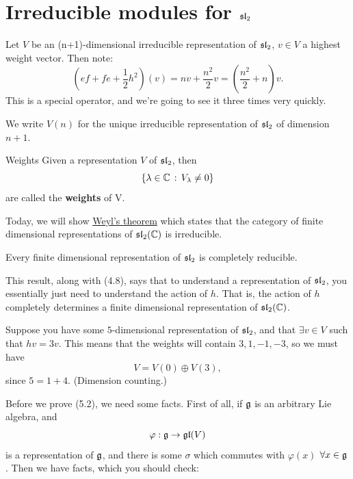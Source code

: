 \documentclass{article}
\begin{document}
\newlec 
\section{Irreducible modules for $\mathfrak{sl}_{2}$}
\begin{remark}
    Let $V$ be an (n+1)-dimensional irreducible representation of $\mathfrak{sl}_{2}$, $v \in V$ a highest weight vector. Then note: \[ (ef + fe + \frac{1}{2}h^{2})(v) = nv + \frac{n^{2}}{2}v = (\frac{n^{2}}{2}+n)v.\]
    This is a special operator, and we're going to see it three times very quickly.
\end{remark}
We write $V(n)$ for the unique irreducible representation of $\mathfrak{sl}_{2}$ of dimension $n+1$.
\begin{fancydefine}{Weights}
    Given a representation $V$ of $\mathfrak{sl}_{2}$, then \[ \{ \lambda \in \mathbb{C} \, : \, V_{\lambda} \neq 0 \}\] are called the \textbf{weights} of V.
\end{fancydefine}
Today, we will show \underline{Weyl's theorem} which states that the category of finite dimensional representations of $\mathfrak{sl}_{2}(\mathbb{C})$ is irreducible.
\begin{fancythm}{}
    Every finite dimensional representation of $\mathfrak{sl}_{2}$ is completely reducible.
\end{fancythm}
This result, along with (4.8), says that to understand a representation of $\mathfrak{sl}_{2}$, you essentially just need to understand the action of $h$. That is, the action of $h$ completely determines a finite dimensional representation of $\mathfrak{sl}_{2}(\mathbb{C})$.
\begin{ex}
    Suppose you have some $5$-dimensional representation of $\mathfrak{sl}_{2}$, and that $\exists v \in V$ such that $hv = 3v$. This means that the weights will contain $3, 1, -1, -3$, so we must have \[ V = V(0) \oplus V(3), \] since $5=1+4$. (Dimension counting.) \endproof
\end{ex}
Before we prove (5.2), we need some facts. First of all, if $\mathfrak{g}$ is an arbitrary Lie algebra, and \[ \varphi : \mathfrak{g} \to \mathfrak{gl}(V) \] is a representation of $\mathfrak{g}$, and there is some $\sigma$ which commutes with $\varphi(x)$ $\forall x \in \mathfrak{g}$. Then we have facts, which you should check:
\end{document}
